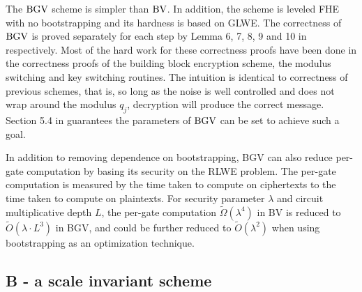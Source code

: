 \documentclass[../main.tex]{subfiles}
\begin{document}
The $\text{BGV}$ scheme is simpler than $\text{BV}$. %
In addition, the scheme is leveled FHE with no bootstrapping and its hardness is based on GLWE. %
The correctness of $\text{BGV}$ is proved separately for each step by Lemma 6, 7, 8, 9 and 10 in \cite{brakerski2014leveled} respectively. Most of the hard work for these correctness proofs have been done in the correctness proofs of the building block encryption scheme, the modulus switching and key switching routines. The intuition is identical to correctness of previous schemes, that is, so long as the noise is well controlled and does not wrap around the modulus $q_j$, decryption will produce the correct message. Section 5.4 in \cite{brakerski2014leveled} guarantees the parameters of $\text{BGV}$ can be set to achieve such a goal.  


In addition to removing dependence on bootstrapping, BGV can also reduce per-gate computation by basing its security on the RLWE problem. The per-gate computation is measured by the time taken to compute on ciphertexts to the time taken to compute on plaintexts. 
For security parameter $\lambda$ and circuit multiplicative depth $L$, the per-gate computation $\tilde{\Omega}(\lambda^4)$ in BV is reduced to $\tilde{O}(\lambda \cdot L^3)$ in BGV, and could be further reduced to $\tilde{O}(\lambda^2)$ when using bootstrapping as an optimization technique. %



\subsection{B - a scale invariant scheme}
\end{document}
